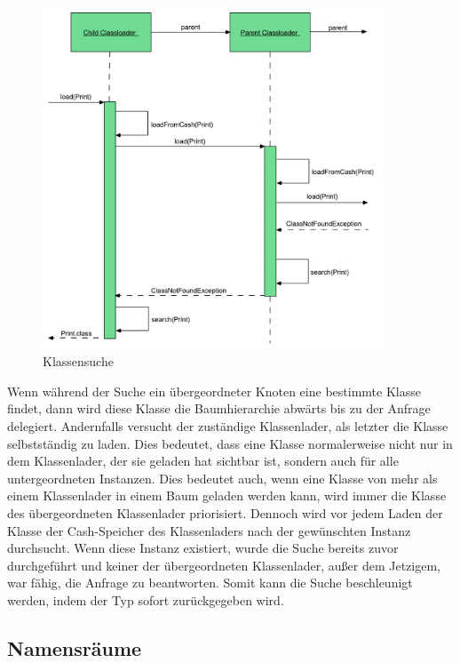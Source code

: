     \begin{figure}[h]
      \centering
      \includegraphics[width=0.9\textwidth]{material/images/flussCL.pdf}
      \caption{Klassensuche \cite{Forman04javareflection}}
      \label{fig:deligation}
    \end{figure}

    Wenn während der Suche ein übergeordneter Knoten eine bestimmte Klasse findet, dann wird diese Klasse die Baumhierarchie abwärts bis zu der Anfrage delegiert. Andernfalls versucht der zuständige Klassenlader, als letzter die Klasse selbstständig zu laden. Dies bedeutet, dass eine Klasse normalerweise nicht nur in dem Klassenlader, der sie geladen hat sichtbar ist, sondern auch für alle untergeordneten Instanzen. Dies bedeutet auch, wenn eine Klasse von mehr als einem Klassenlader in einem Baum geladen werden kann, wird immer die Klasse des übergeordneten Klassenlader priorisiert. Dennoch wird vor jedem Laden der Klasse der Cash-Speicher des Klassenladers nach der gewünschten Instanz durchsucht. Wenn diese Instanz existiert, wurde die Suche bereits zuvor durchgeführt und keiner der übergeordneten Klassenlader, außer dem Jetzigem, war fähig, die Anfrage zu beantworten. Somit kann die Suche beschleunigt werden, indem der Typ sofort zurückgegeben wird. \cite{parentDelegationModel}


  \subsection{Namensräume} \label{sec:nam}

